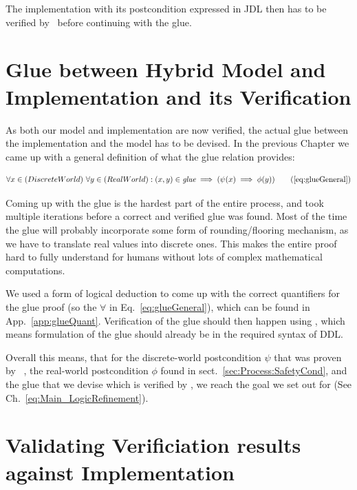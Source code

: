 The implementation with its postcondition expressed in JDL then has to be verified by \key~before continuing with the glue. 

\section{Glue between Hybrid Model and Implementation and its Verification}
\label{sec:Process:Glue}

As both our model and implementation are now verified, the actual glue between the implementation and the model has to be devised. In the previous Chapter we came up with a general definition of what the glue relation provides:

\begin{equation}
	\centering
	\begin{split}
		\forall x \in (Discrete World)~\forall y \in (Real World):(x,y) \in \textit{glue} \implies (\psi(x) \implies \phi(y))
	\end{split}
	\tag{\ref{eq:glueGeneral}}
\end{equation}

Coming up with the glue is the hardest part of the entire process, and took multiple iterations before a correct and verified glue was found. Most of the time the glue will probably incorporate some form of rounding/flooring mechanism, as we have to translate real values into discrete ones. This makes the entire proof hard to fully understand for humans without lots of complex mathematical computations.

We used a form of logical deduction to come up with the correct quantifiers for the glue proof (so the \(\forall\) in Eq.~\ref{eq:glueGeneral}), which can be found in App.~\ref{app:glueQuant}. Verification of the glue should then happen using \keym, which means formulation of the glue should already be in the required syntax of DDL.

Overall this means, that for the discrete-world postcondition \(\psi\) that was proven by \key~, the real-world postcondition \(\phi\) found in sect.~\ref{sec:Process:SafetyCond}, and the glue that we devise which is verified by \keym, we reach the goal we set out for (See Ch.~\ref{eq:Main_LogicRefinement}).

\section{Validating Verificiation results against Implementation}
\label{sec:Process:Eval}

